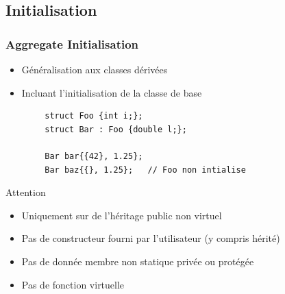 \documentclass[C++.tex]{subfiles}
\begin{document}
\subsection*{Initialisation}
\begin{frame}[fragile]
	\frametitle{Aggregate Initialisation}
	\begin{itemize}
		\item Généralisation aux classes dérivées
		\item Incluant l'initialisation de la classe de base
	\end{itemize}

	\begin{verbatim}
		struct Foo {int i;};
		struct Bar : Foo {double l;};

		Bar bar{{42}, 1.25};
		Bar baz{{}, 1.25};   // Foo non intialise
	\end{verbatim}

	\begin{alertblock}{Attention}
		\begin{itemize}
			\item Uniquement sur de l'héritage public non virtuel
			\item Pas de constructeur fourni par l'utilisateur (y compris hérité)
			\item Pas de donnée membre non statique privée ou protégée
			\item Pas de fonction virtuelle
		\end{itemize}
	\end{alertblock}



\end{frame}
\end{document}
